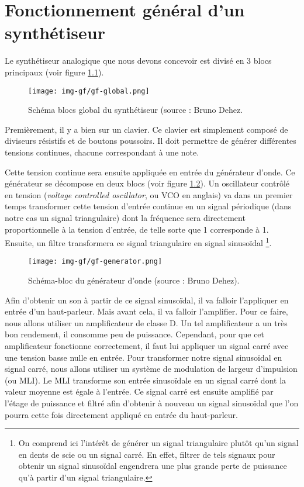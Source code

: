 \chapter{Fonctionnement général d'un synthétiseur}
Le synthétiseur analogique que nous devons concevoir
est divisé en 3 blocs principaux (voir figure \ref{fig:gf-global}).

\begin{figure}[ht]
	\centering
	\texttt{[image: img-gf/gf-global.png]}
	\caption{Schéma blocs global du synthétiseur (source : Bruno Dehez.}
	\label{fig:gf-global}
\end{figure}

Premièrement, il y a bien sur un clavier. Ce clavier est simplement
composé de diviseurs résistifs et de boutons poussoirs. Il doit
permettre de générer différentes tensions continues, chacune
correspondant à une note.

Cette tension continue sera ensuite appliquée en entrée du générateur
d'onde. Ce générateur se décompose en deux blocs (voir figure
\ref{fig:gf-generator}). Un oscillateur contrôlé en tension 
(\textit{voltage controlled oscillator}, ou VCO en anglais) va dans
un premier temps transformer cette tension d'entrée continue
en un signal périodique (dans notre cas un signal triangulaire) 
dont la fréquence sera directement proportionnelle
à la tension d'entrée, de telle sorte que
\unit{1}{\milli\volt} corresponde à \unit{1}{\hertz}. Ensuite, un filtre
transformera ce signal triangulaire en signal sinusoïdal
\footnote{On comprend ici l'intérêt de générer un signal triangulaire plutôt
qu'un signal en dents de scie ou un signal carré. En effet, filtrer
de tels signaux pour obtenir un signal sinusoïdal engendrera
une plus grande perte de puissance qu'à partir d'un signal
triangulaire.}.

\begin{figure}[ht]
	\centering
	\texttt{[image: img-gf/gf-generator.png]}
	\caption{Schéma-bloc du générateur d'onde (source : Bruno Dehez).}
	\label{fig:gf-generator}
\end{figure}

Afin d'obtenir un son à partir de ce signal sinusoïdal, il
va falloir l'appliquer en entrée d'un haut-parleur. Mais avant
cela, il va falloir l'amplifier. Pour ce faire, nous allons
utiliser un amplificateur de classe D. Un tel amplificateur
a un très bon rendement, il consomme peu de puissance. Cependant,
pour que cet amplificateur fonctionne correctement, il faut
lui appliquer un signal carré avec une tension basse nulle en entrée. Pour transformer
notre signal sinusoïdal en signal carré, nous allons utiliser un
système de modulation de largeur d'impulsion (ou MLI). Le MLI
transforme son entrée sinusoïdale en un signal carré dont la
valeur moyenne est égale à l'entrée. Ce
signal carré est ensuite amplifié par l'étage de puissance
et filtré afin d'obtenir à nouveau un signal sinusoïdal que
l'on pourra cette fois directement appliqué en entrée du haut-parleur.

